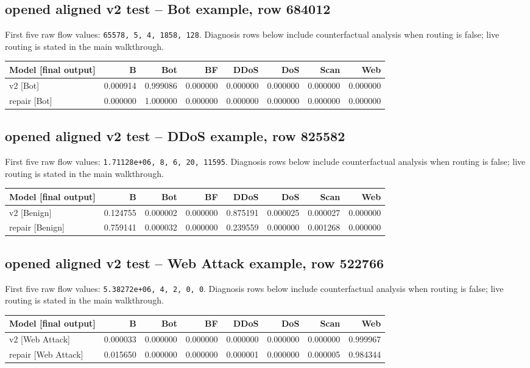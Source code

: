\documentclass[11pt,a4paper,oneside]{report}
\newcommand{\code}[1]{\nolinkurl{#1}}
\begin{document}
\subsection{opened aligned v2 test -- Bot example, row 684012}
First five raw flow values: \code{65578, 5, 4, 1858, 128}.
Diagnosis rows below include counterfactual analysis when routing is false; live routing is stated in the main walkthrough.

{\small
\begin{longtable}{@{}p{}rrrrrrr@{}}
\toprule
Model [final output] & B & Bot & BF & DDoS & DoS & Scan & Web\\\midrule\endhead
v2 [Bot] & 0.000914 & 0.999086 & 0.000000 & 0.000000 & 0.000000 & 0.000000 & 0.000000\\
repair [Bot] & 0.000000 & 1.000000 & 0.000000 & 0.000000 & 0.000000 & 0.000000 & 0.000000\\
\bottomrule\end{longtable}
}

\subsection{opened aligned v2 test -- DDoS example, row 825582}
First five raw flow values: \code{1.71128e+06, 8, 6, 20, 11595}.
Diagnosis rows below include counterfactual analysis when routing is false; live routing is stated in the main walkthrough.

{\small
\begin{longtable}{@{}p{}rrrrrrr@{}}
\toprule
Model [final output] & B & Bot & BF & DDoS & DoS & Scan & Web\\\midrule\endhead
v2 [Benign] & 0.124755 & 0.000002 & 0.000000 & 0.875191 & 0.000025 & 0.000027 & 0.000000\\
repair [Benign] & 0.759141 & 0.000032 & 0.000000 & 0.239559 & 0.000000 & 0.001268 & 0.000000\\
\bottomrule\end{longtable}
}

\subsection{opened aligned v2 test -- Web Attack example, row 522766}
First five raw flow values: \code{5.38272e+06, 4, 2, 0, 0}.
Diagnosis rows below include counterfactual analysis when routing is false; live routing is stated in the main walkthrough.

{\small
\begin{longtable}{@{}p{}rrrrrrr@{}}
\toprule
Model [final output] & B & Bot & BF & DDoS & DoS & Scan & Web\\\midrule\endhead
v2 [Web Attack] & 0.000033 & 0.000000 & 0.000000 & 0.000000 & 0.000000 & 0.000000 & 0.999967\\
repair [Web Attack] & 0.015650 & 0.000000 & 0.000000 & 0.000001 & 0.000000 & 0.000005 & 0.984344\\
\bottomrule\end{longtable}
}
\end{document}
